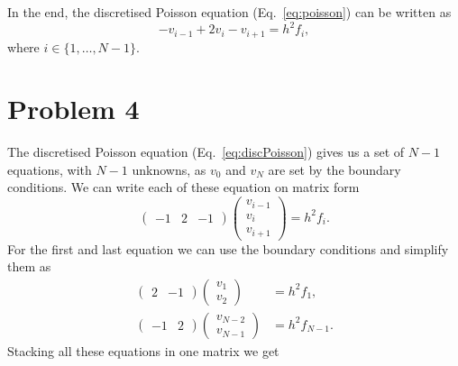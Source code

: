 \documentclass[english,notitlepage,aps,pra,10pt]{revtex4-1}  %
\begin{document}
In the end, the discretised Poisson equation (Eq.~\ref{eq:poisson}) can be written as
\begin{equation}
    -v_{i-1} + 2v_i - v_{i+1} = h^2 f_i,
    \label{eq:discPoisson}
\end{equation} 
where $i \in \{1,\dots, N-1\}$.

\section*{Problem 4}

The discretised Poisson equation (Eq.~\ref{eq:discPoisson}) gives us a set of $N-1$ equations, with $N-1$ unknowns, as $v_0$ and $v_N$ are set by the boundary conditions. We can write each of these equation on matrix form
\begin{equation}
    \begin{pmatrix}
        -1 & 2 & -1
    \end{pmatrix}
    \begin{pmatrix}
        v_{i-1} \\
        v_i \\
        v_{i+1}
    \end{pmatrix}
    = h^2 f_i.
\end{equation} 
For the first and last equation we can use the boundary conditions and simplify them as  
\begin{equation}
    \begin{split}
        \begin{pmatrix}
            2 & -1
        \end{pmatrix}
        \begin{pmatrix}
            v_1 \\
            v_2
        \end{pmatrix}
        &= h^2 f_1, \\
        \begin{pmatrix}
            -1 & 2
        \end{pmatrix}
        \begin{pmatrix}
            v_{N-2} \\
            v_{N-1}
        \end{pmatrix}
        &= h^2 f_{N-1}.
    \end{split}
\end{equation}
Stacking all these equations in one matrix we get 
\end{document}
